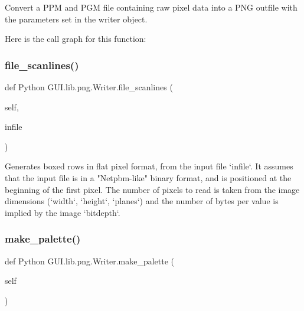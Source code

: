 \begin{DoxyVerb}Convert a PPM and PGM file containing raw pixel data into a
PNG outfile with the parameters set in the writer object.
\end{DoxyVerb}
 Here is the call graph for this function\+:
\mbox{\label{class_python_01_g_u_i_1_1lib_1_1png_1_1_writer_a2f504a74306d7bed190719de08eeb272}} 
\subsubsection{\texorpdfstring{file\+\_\+scanlines()}{file\_scanlines()}}
{\footnotesize\ttfamily def Python G\+U\+I.\+lib.\+png.\+Writer.\+file\+\_\+scanlines (\begin{DoxyParamCaption}\item[{}]{self,  }\item[{}]{infile }\end{DoxyParamCaption})}

\begin{DoxyVerb}Generates boxed rows in flat pixel format, from the input file
`infile`.  It assumes that the input file is in a "Netpbm-like"
binary format, and is positioned at the beginning of the first
pixel.  The number of pixels to read is taken from the image
dimensions (`width`, `height`, `planes`) and the number of bytes
per value is implied by the image `bitdepth`.
\end{DoxyVerb}
 \mbox{\label{class_python_01_g_u_i_1_1lib_1_1png_1_1_writer_ae230c94e859c63c11bd9ee6d0ac94c9e}} 
\subsubsection{\texorpdfstring{make\+\_\+palette()}{make\_palette()}}
{\footnotesize\ttfamily def Python G\+U\+I.\+lib.\+png.\+Writer.\+make\+\_\+palette (\begin{DoxyParamCaption}\item[{}]{self }\end{DoxyParamCaption})}

